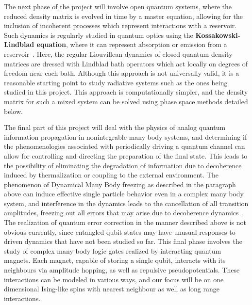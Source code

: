 \documentclass[a4paper,11pt,color]{article}
\begin{document}
The next phase of the project will involve  open quantum systems, where the reduced density matrix is evolved in time by a master equation, allowing for the inclusion of incoherent processes which represent interactions with a reservoir. Such dynamics is regularly studied in quantum optics using the \textbf{Kossakowski-Lindblad equation}, where it can represent absorption or emission from a reservoir~\cite{lindblad}. Here, the regular Liouvillean dynamics of closed quantum density matrices are dressed with Lindblad bath operators which act locally on degrees of freedom near each bath. Although this approach is not universally valid, it is a reasonable starting point to study radiative systems such as the ones being studied in this project.  This approach is computationally simpler, and the density matrix for such a mixed system can be solved using phase space methods detailed below.

The final part of this project will deal with the physics of analog quantum information propagation in nonintegrable many body systems, and determining if the phenomenologies associated with periodically driving a quantum channel can allow for controlling and directing the preparation of the final state. This leads to the possibility of eliminating the degradation of information due to decoherence induced by thermalization or coupling to the external environment.  The phenomenon of Dynamical Many Body freezing as described in the paragraph above can induce effective single particle behavior even in a complex many body system, and interference in the dynamics leads to the  cancellation of all transition amplitudes, freezing out all errors that may arise due to decoherence dynamics~\cite{freezing}. The realization of quantum error correction in the manner described above is not obvious currently, since entangled qubit states may have unusual responses to driven dynamics that have not been studied so far. This final phase  involves the study of complex many body logic gates realized by interacting quantum magnets. Each magnet, capable of storing a single qubit, interacts with its neighbours via amplitude hopping, as well as repulsive pseudopotentials. These interactions can be modeled in various ways, and our focus will be on one dimensional Ising-like spins with nearest neighbour as well as long range interactions. 
\end{document}
